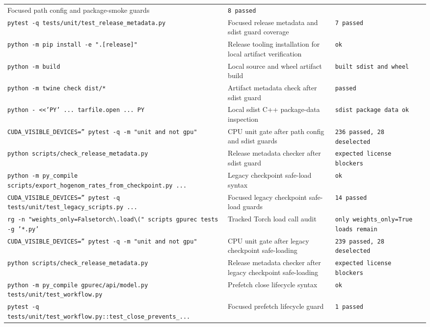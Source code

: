 \documentclass[11pt]{article}
\begin{document}
\begin{center}
\begin{tabular}{lll}
Focused path config and package-smoke guards &
\texttt{8 passed} \\
\texttt{pytest -q tests/unit/test\_release\_metadata.py} &
Focused release metadata and sdist guard coverage &
\texttt{7 passed} \\
\texttt{python -m pip install -e ".[release]"} &
Release tooling installation for local artifact verification &
\texttt{ok} \\
\texttt{python -m build} &
Local source and wheel artifact build &
\texttt{built sdist and wheel} \\
\texttt{python -m twine check dist/*} &
Artifact metadata check after sdist guard &
\texttt{passed} \\
\texttt{python - <<'PY' ... tarfile.open ... PY} &
Local sdist C++ package-data inspection &
\texttt{sdist package data ok} \\
\texttt{CUDA\_VISIBLE\_DEVICES='' pytest -q -m "unit and not gpu"} &
CPU unit gate after path config and sdist guards &
\texttt{236 passed, 28 deselected} \\
\texttt{python scripts/check\_release\_metadata.py} &
Release metadata checker after sdist guard &
\texttt{expected license blockers} \\
\texttt{python -m py\_compile scripts/export\_hogenom\_rates\_from\_checkpoint.py ...} &
Legacy checkpoint safe-load syntax &
\texttt{ok} \\
\texttt{CUDA\_VISIBLE\_DEVICES='' pytest -q tests/unit/test\_legacy\_scripts.py ...} &
Focused legacy checkpoint safe-load guards &
\texttt{14 passed} \\
\texttt{rg -n "weights\_only=False\textbar{}torch\textbackslash{}.load\textbackslash{}(" scripts gpurec tests -g '*.py'} &
Tracked Torch load call audit &
\texttt{only weights\_only=True loads remain} \\
\texttt{CUDA\_VISIBLE\_DEVICES='' pytest -q -m "unit and not gpu"} &
CPU unit gate after legacy checkpoint safe-loading &
\texttt{239 passed, 28 deselected} \\
\texttt{python scripts/check\_release\_metadata.py} &
Release metadata checker after legacy checkpoint safe-loading &
\texttt{expected license blockers} \\
\texttt{python -m py\_compile gpurec/api/model.py tests/unit/test\_workflow.py} &
Prefetch close lifecycle syntax &
\texttt{ok} \\
\texttt{pytest -q tests/unit/test\_workflow.py::test\_close\_prevents\_...} &
Focused prefetch lifecycle guard &
\texttt{1 passed} \\

\end{tabular}
\end{center}
\end{document}
